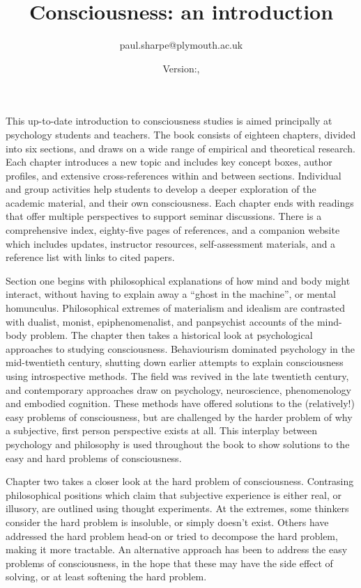 \documentclass[a4paper]{article}
\begin{document}
\title{Consciousness: an introduction}
\date{Version:\gitRels{}, \gitAuthorDate{} }
\author{paul.sharpe@plymouth.ac.uk}

\maketitle

This up-to-date introduction to consciousness studies is aimed principally at
psychology students and teachers. The book consists of eighteen chapters,
divided into six sections, and draws on a wide range of empirical and
theoretical research. Each chapter introduces a new topic and includes key
concept boxes, author profiles, and extensive cross-references within and
between sections. Individual and group activities help students to develop a
deeper exploration of the academic material, and their own consciousness. Each
chapter ends with readings that offer multiple perspectives to support seminar
discussions. There is a comprehensive index, eighty-five pages of references,
and a companion website which includes updates, instructor resources,
self-assessment materials, and a reference list with links to cited papers.

Section one begins with philosophical explanations of how mind and body might
interact, without having to explain away a ``ghost in the machine'', or mental
homunculus. Philosophical extremes of materialism and idealism are contrasted
with dualist, monist, epiphenomenalist, and panpsychist accounts of the
mind-body problem. The chapter then takes a historical look at psychological
approaches to studying consciousness. Behaviourism dominated psychology in the
mid-twentieth century, shutting down earlier attempts to explain consciousness
using introspective methods. The field was revived in the late twentieth
century, and contemporary approaches draw on psychology, neuroscience,
phenomenology and embodied cognition. These methods have offered solutions to
the (relatively!) easy problems of consciousness, but are challenged by the
harder problem of why a subjective, first person perspective exists at all.
This interplay between psychology and philosophy is used throughout the book
to show solutions to the easy and hard problems of consciousness.

Chapter two takes a closer look at the hard problem of consciousness.
Contrasing philosophical positions which claim that subjective experience is
either real, or illusory, are outlined using thought experiments. At the
extremes, some thinkers consider the hard problem is insoluble, or simply
doesn’t exist. Others have addressed the hard problem head-on or tried to
decompose the hard problem, making it more tractable. An alternative approach
has been to address the easy problems of consciousness, in the hope that these
may have the side effect of solving, or at least softening the hard problem.
\end{document}

